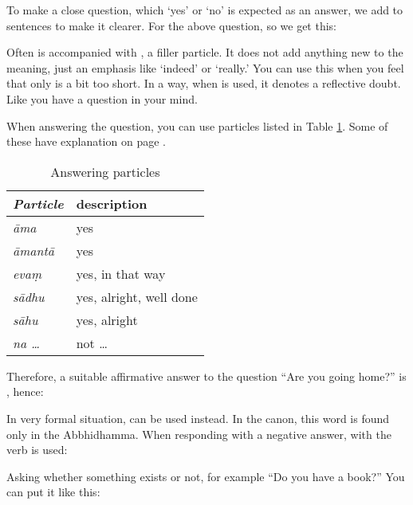 To make a close question, which `yes' or `no' is expected as an answer, we add  to sentences to make it clearer. For the above question, so we get this:


Often  is accompanied with , a filler particle. It does not add anything new to the meaning, just an emphasis like `indeed' or `really.' You can use this when you feel that only  is a bit too short. In a way, when  is used, it denotes a reflective doubt. Like you have a question in your mind.


When answering the question, you can use particles listed in Table \ref{tab:indans}. Some of these have explanation on page \pageref{nip:resp}.

\begin{table}[!hbt]
\centering
\caption{Answering particles}
\label{tab:indans}
\bigskip
\begin{tabular}{>{\itshape}ll} \toprule
\bfseries\upshape Particle & \bfseries description \\ \midrule
\=ama & yes \\
\=amant\=a & yes \\
eva\d m & yes, in that way \\
s\=adhu & yes, alright, well done \\
s\=ahu & yes, alright \\
na \ldots & not \ldots \\
\bottomrule
\end{tabular}
\end{table}

Therefore, a suitable affirmative answer to the question ``Are you going home?'' is , hence:


In very formal situation,  can be used instead. In the canon, this word is found only in the Abbhidhamma. When responding with a negative answer,  with the verb is used:


Asking whether something exists or not, for example ``Do you have a book?'' You can put it like this:


